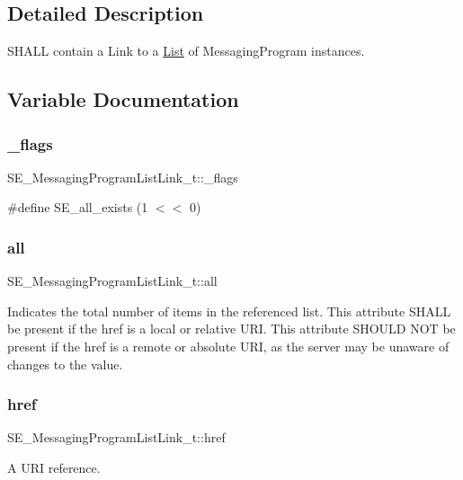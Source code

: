 \subsection{Detailed Description}
S\+H\+A\+LL contain a Link to a \hyperlink{structList}{List} of Messaging\+Program instances. 

\subsection{Variable Documentation}
\mbox{\label{group__MessagingProgramListLink_gacaf8f61da354e26c709cf070f085c9ac}} 
\subsubsection{\texorpdfstring{\+\_\+flags}{\_flags}}
{\footnotesize\ttfamily S\+E\+\_\+\+Messaging\+Program\+List\+Link\+\_\+t\+::\+\_\+flags}

\#define S\+E\+\_\+all\+\_\+exists (1 $<$$<$ 0) \mbox{\label{group__MessagingProgramListLink_ga6995e02d8ec9a63b3ead9a04addff2d9}} 
\subsubsection{\texorpdfstring{all}{all}}
{\footnotesize\ttfamily S\+E\+\_\+\+Messaging\+Program\+List\+Link\+\_\+t\+::all}

Indicates the total number of items in the referenced list. This attribute S\+H\+A\+LL be present if the href is a local or relative U\+RI. This attribute S\+H\+O\+U\+LD N\+OT be present if the href is a remote or absolute U\+RI, as the server may be unaware of changes to the value. \mbox{\label{group__MessagingProgramListLink_ga9de2a5b8c7445491974f50c066dd63ee}} 
\subsubsection{\texorpdfstring{href}{href}}
{\footnotesize\ttfamily S\+E\+\_\+\+Messaging\+Program\+List\+Link\+\_\+t\+::href}

A U\+RI reference. 